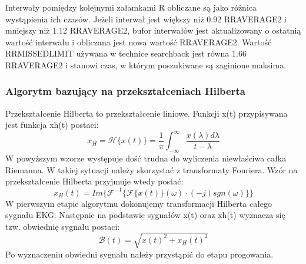 \begin{enumerate}[I.]
Interwały pomiędzy kolejnymi załamkami R obliczane są jako różnica wystąpienia ich czasów. Jeżeli interwał jest większy niż 0.92 RRAVERAGE2 i mniejszy niż 1.12 RRAVERAGE2, bufor interwałów jest aktualizowany o ostatnią wartość interwału i obliczana jest nowa wartość RRAVERAGE2. Wartość RRMISSEDLIMIT używana w technice searchback jest równa 1.66 RRAVERAGE2 i stanowi czas, w którym poszukiwane są zaginione maksima.
\end{enumerate}
\subsubsection{Algorytm bazujący na przekształceniach Hilberta}
Przekształcenie Hilberta to przekształcenie liniowe. Funkcji x(t) przypisywana jest funkcja xh(t) postaci:
\begin{equation}
x_H = \mathcal{H}\{x(t)\}=\frac{1}{\pi}\int_{-\infty}^\infty \frac{x(\lambda)d\lambda}{t-\lambda}
\end{equation}
W powyższym wzorze występuje dość trudna do wyliczenia niewłaściwa całka Riemanna. W takiej sytuacji należy skorzystać z transformaty Fouriera. Wzór na przekształcenie Hilberta przyjmuje wtedy postać:
\begin{equation}
x_H(t)=Im \{ \mathcal{F}^{-1} \{ \mathcal{F} \{ x(t) \}(\omega)\cdot (-j)sgn(\omega)\}  \}
\end{equation}
W pierwszym etapie algorytmu dokonujemy transformacji Hilberta całego sygnału EKG. Następnie na podstawie sygnałów x(t) oraz xh(t) wyznacza się tzw. obwiednię sygnału postaci:
\begin{equation}
\mathcal{B}(t)=\sqrt{x(t)^2+x_H(t)^2}
\end{equation}
Po wyznaczeniu obwiedni sygnału należy przystąpić do etapu progowania.

